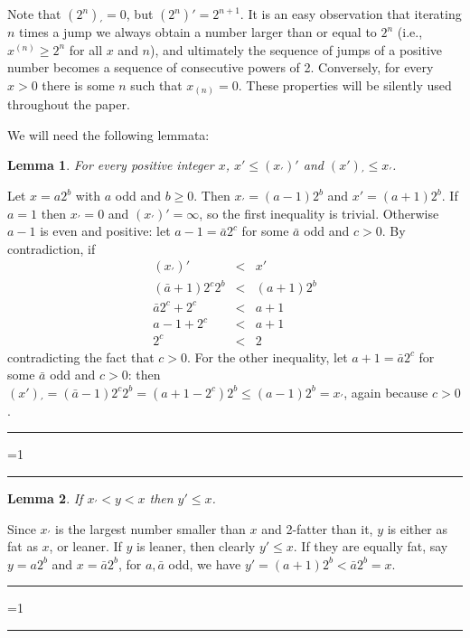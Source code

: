 \documentclass[a4paper]{article}
\newcounter{noqed}
\newcommand{\qed}{ \ifmmode\mbox{
}\fi\rule[-.05em]{.3em}{.7em}\setcounter{noqed}{0}}
\newenvironment{proof}[1][{}]{\noindent{\bf Proof#1.
}\setcounter{noqed}{1}}{\ifnum\value{noqed}=1\qed\fi\par\medskip}
\newtheorem{lemma}{Lemma}
\newcommand{\?}{\mskip1.5mu}
\begin{document}
Note that $(2^n)_\prime=0$, but $(2^n)'=2^{n+1}$. It is an easy observation that iterating $n$ times a jump we always obtain a
number larger than or equal to $2^n$ (i.e., $x^{(n)}\geq 2^n$ for all $x$ and $n$), and
ultimately the sequence of jumps of a positive number becomes a sequence of consecutive powers of 2.  
Conversely, for every $x>0$ there is some $n$ such that $x_{(n)}=0$.
These properties will be silently used throughout the paper.

We will need the following lemmata:
\begin{lemma}
\label{lemma:updown}
For every positive integer $x$, $x'\leq (x_\prime)'$ and $(x')_\prime \leq x_\prime$.
\end{lemma}
\begin{proof}
Let $x=a2^b$ with $a$ odd and $b\geq 0$. Then $x_\prime=(a-1)2^b$ and $x'=(a+1)2^b$. 
If $a=1$ then $x_\prime=0$ and $(x_\prime)'=\infty$, so the first inequality is trivial. Otherwise $a-1$ is even and positive:
let $a-1=\bar a2^c$ for some $\bar a$ odd and $c>0$.
By contradiction, if 
\begin{eqnarray*}
(x_\prime)' &<& x'\\
(\bar a + 1)2^c2^b &<& (a+1)2^b\\
\bar a 2^c + 2^c &<& a+1\\
a-1+2^c &<& a+1\\
2^c &<& 2  
\end{eqnarray*}
contradicting the fact that $c>0$.
For the other inequality, let $a+1=\bar a2^c$ for some $\bar a$ odd and $c>0$: then
$(x')_\prime=(\bar a-1)2^c2^b=(a+1-2^c)2^b\leq(a-1)2^b=x_\prime$, again because $c>0$.\qed
\end{proof}

\begin{lemma}
\label{lemma:semipar}
If $x_\prime<y<x$ then $y'\leq x$.
\end{lemma}
\begin{proof}
Since $x_\prime$ is the largest number smaller than $x$ and 2-fatter than it, $y$ is either as fat as $x$,
or leaner. If $y$ is leaner, then clearly $y'\leq x$. If they are equally fat, say $y=a2^b$ and $x=\bar a2^b$,
for $a,\bar a$ odd, we have $y'=(a+1)2^b<\bar a2^b=x$.  \qed
\end{proof}
\end{document}
